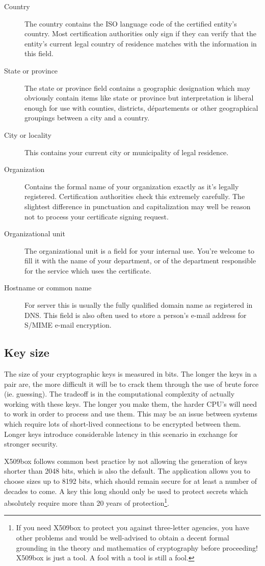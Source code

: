 \documentclass[a4paper,12pt]{article}
\begin{document}
\begin{description}
\item[Country]The country contains the ISO language code of the certified entity's country. Most certification authorities only sign if they can verify that the entity's current legal country of residence matches with the information in this field.
\item[State or province]The state or province field contains a geographic designation which may obviously contain items like state or province but interpretation is liberal enough for use with counties, districts, départements or other geographical groupings between a city and a country.
\item[City or locality]This contains your current city or municipality of legal residence.
\item[Organization]Contains the formal name of your organization exactly as it's legally registered. Certification authorities check this extremely carefully. The slightest difference in punctuation and capitalization may well be reason not to process your certificate signing request.
\item[Organizational unit]The organizational unit is a field for your internal use. You're welcome to fill it with the name of your department, or of the department responsible for the service which uses the certificate.
\item[Hostname or common name]For server this is usually the fully qualified domain name as registered in DNS. This field is also often used to store a person's e-mail address for S/MIME e-mail encryption.
\end{description}

\subsection{Key size}
The size of your cryptographic keys is measured in bits. The longer the keys in a pair are, the more difficult it will be to crack them through the use of brute force (ie. guessing). The tradeoff is in the computational complexity of actually working with these keys. The longer you make them, the harder CPU's will need to work in order to process and use them. This may be an issue between systems which require lots of short-lived connections to be encrypted between them. Longer keys introduce considerable latency in this scenario in exchange for stronger security.

X509box follows common best practice by not allowing the generation of keys shorter than 2048 bits, which is also the default. The application allows you to choose sizes up to 8192 bits, which should remain secure for at least a number of decades to come. A key this long should only be used to protect secrets which absolutely require more than 20 years of protection\footnote{If you need X509box to protect you against three-letter agencies, you have other problems and would be well-advised to obtain a decent formal grounding in the theory and mathematics of cryptography before proceeding! X509box is just a tool. A fool with a tool is still a fool.}.
\end{document}
